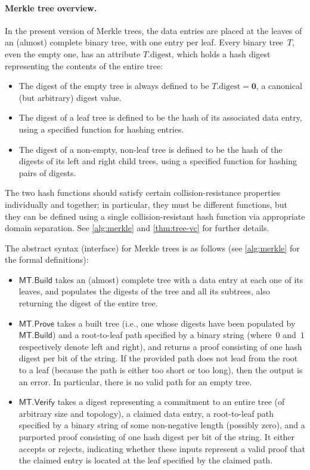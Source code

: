 \documentclass[11pt,hidelinks]{article}
\newcommand{\algo}[1]{\ensuremath{\mathsf{#1}}}
\newcommand{\specialhash}{\ensuremath{\mathbf{0}}}
\newcommand{\MT}{\algo{MT}}
\newcommand{\Build}{\algo{Build}}
\newcommand{\Prove}{\algo{Prove}}
\newcommand{\Verify}{\algo{Verify}}
\begin{document}
\paragraph{Merkle tree overview.}

In the present version of Merkle trees, the data entries are placed at
the leaves of an (almost) complete binary tree, with one entry per
leaf. Every binary tree~$T$, even the empty one, has an attribute
$T.\text{digest}$, which holds a hash digest representing the contents
of the entire tree:
\begin{itemize}[itemsep=0pt]
\item The digest of the empty tree is always defined to be
  $T.\text{digest} = \specialhash$, a canonical (but arbitrary)
  digest value.
\item The digest of a leaf tree is defined to be the hash of its
  associated data entry, using a specified function for hashing
  entries.
\item The digest of a non-empty, non-leaf tree is defined to be the
  hash of the digests of its left and right child trees, using a
  specified function for hashing pairs of digests.
\end{itemize}
The two hash functions should satisfy certain collision-resistance
properties individually and together; in particular, they must be
different functions, but they can be defined using a single
collision-resistant hash function via appropriate domain
separation. See \cref{alg:merkle} and \cref{thm:tree-vc} for further
details.

\medskip
\noindent The abstract syntax (interface) for Merkle trees is as
follows (see \cref{alg:merkle} for the formal definitions):
\begin{itemize}
\item $\MT.\Build$ takes an (almost) complete tree with a data entry
  at each one of its leaves, and populates the digests of the tree and
  all its subtrees, also returning the digest of the entire tree.

\item $\MT.\Prove$ takes a built tree (i.e., one whose digests have
  been populated by $\MT.\Build$) and a root-to-leaf path specified by
  a binary string (where~$0$ and~$1$ respectively denote left and
  right), and returns a proof consisting of one hash digest per bit of
  the string. If the provided path does not lead from the root to a
  leaf (because the path is either too short or too long), then the
  output is an error. In particular, there is no valid path for an
  empty tree.

\item $\MT.\Verify$ takes a digest representing a commitment to an
  entire tree (of arbitrary size and topology), a claimed data entry,
  a root-to-leaf path specified by a binary string of some
  non-negative length (possibly zero), and a purported proof
  consisting of one hash digest per bit of the string. It either
  accepts or rejects, indicating whether these inputs represent a
  valid proof that the claimed entry is located at the leaf specified
  by the claimed path.
\end{itemize}
\end{document}
